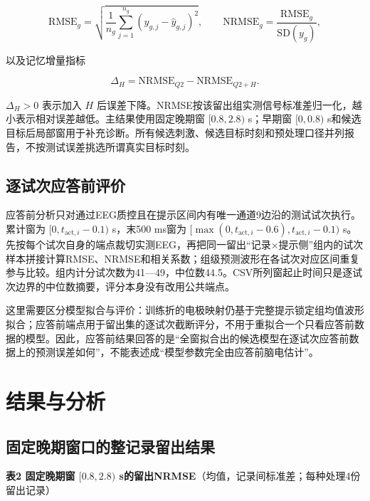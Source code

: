 \documentclass[UTF8,12pt,a4paper,fontset=windows]{ctexart}
\begin{document}
\[
\mathrm{RMSE}_g=\sqrt{\frac{1}{n_g}\sum_{j=1}^{n_g}(y_{g,j}-\hat y_{g,j})^2},\qquad
\mathrm{NRMSE}_g=\frac{\mathrm{RMSE}_g}{\mathrm{SD}(y_g)},
\]

以及记忆增量指标

\[
\Delta_H=\mathrm{NRMSE}_{Q2}-\mathrm{NRMSE}_{Q2+H}.
\]

\(\Delta_H>0\) 表示加入 \(H\) 后误差下降。NRMSE按该留出组实测信号标准差归一化，越小表示相对误差越低。主结果使用固定晚期窗 \([0.8,2.8)\) s；早期窗 \([0,0.8)\) s和候选目标后局部窗用于补充诊断。所有候选刺激、候选目标时刻和预处理口径并列报告，不按测试误差挑选所谓真实目标时刻。

\hypertarget{ux9010ux8bd5ux6b21ux5e94ux7b54ux524dux8bc4ux4ef7}{%
\subsection{逐试次应答前评价}\label{ux9010ux8bd5ux6b21ux5e94ux7b54ux524dux8bc4ux4ef7}}

应答前分析只对通过EEG质控且在提示区间内有唯一通道9边沿的测试试次执行。累计窗为 \([0,t_{\mathrm{act},i}-0.1)\) s，末500 ms窗为 \([\max(0,t_{\mathrm{act},i}-0.6),t_{\mathrm{act},i}-0.1)\) s。先按每个试次自身的端点裁切实测EEG，再把同一留出``记录×提示侧''组内的试次样本拼接计算RMSE、NRMSE和相关系数；组级预测波形在各试次对应区间重复参与比较。组内计分试次数为41---49，中位数44.5。CSV所列窗起止时间只是逐试次边界的中位数摘要，评分本身没有改用公共端点。

这里需要区分模型拟合与评价：训练折的电极映射仍基于完整提示锁定组均值波形拟合；应答前端点用于留出集的逐试次截断评分，不用于重拟合一个只看应答前数据的模型。因此，应答前结果回答的是``全窗拟合出的候选模型在逐试次应答前数据上的预测误差如何''，不能表述成``模型参数完全由应答前脑电估计''。

\hypertarget{ux7ed3ux679cux4e0eux5206ux6790}{%
\section{结果与分析}\label{ux7ed3ux679cux4e0eux5206ux6790}}

\hypertarget{ux56faux5b9aux665aux671fux7a97ux53e3ux7684ux6574ux8bb0ux5f55ux7559ux51faux7ed3ux679c}{%
\subsection{固定晚期窗口的整记录留出结果}\label{ux56faux5b9aux665aux671fux7a97ux53e3ux7684ux6574ux8bb0ux5f55ux7559ux51faux7ed3ux679c}}

\textbf{表2 固定晚期窗 \([0.8,2.8)\) s的留出NRMSE}（均值，记录间标准差；每种处理4份留出记录）
\end{document}
